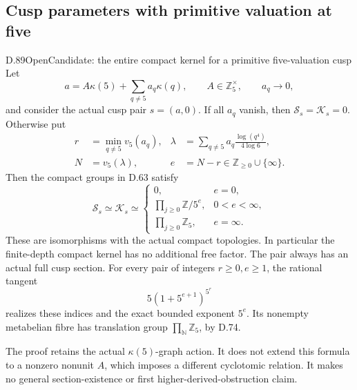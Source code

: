 \subsection{Cusp parameters with primitive valuation at five}

\begin{statement}{D.89}{Open}{Candidate: the entire compact kernel for a primitive five-valuation cusp}
Let
\[
 a=A\kappa(5)+\sum_{q\ne5}a_q\kappa(q),\qquad
 A\in\mathbb Z_5^\times,\qquad a_q\longrightarrow0,
\]
and consider the actual cusp pair \(s=(a,0)\).
If all \(a_q\) vanish, then \(\mathcal S_s=\mathcal K_s=0\).
Otherwise put
\[
 \begin{aligned}
 r&=\min_{q\ne5}v_5(a_q),&
 \lambda&=\sum_{q\ne5}a_q\frac{\log(q^4)}{4\log6},\\
 N&=v_5(\lambda),&e&=N-r\in\mathbb Z_{\ge0}\cup\{\infty\}.
 \end{aligned}                                             \tag{D.89.1}
\]
Then the compact groups in D.63 satisfy
\[
 \mathcal S_s\simeq\mathcal K_s\simeq
 \begin{cases}
  0,&e=0,\\
  \displaystyle\prod_{j\ge0}\mathbb Z/5^e,&0<e<\infty,\\
  \displaystyle\prod_{j\ge0}\mathbb Z_5,&e=\infty.
 \end{cases}                                               \tag{D.89.2}
\]
These are isomorphisms with the actual compact topologies.
In particular the finite-depth compact kernel has no additional
free factor. The pair always has an actual full cusp section.
For every pair of integers \(r\ge0,e\ge1\), the rational
tangent
\[
                  5(1+5^{e+1})^{5^r}                     \tag{D.89.3}
\]
realizes these indices and the exact bounded exponent \(5^e\).
Its nonempty metabelian fibre has translation group
\(\prod_{\mathbb N}\mathbb Z_5\), by D.74.

The proof retains the actual \(\kappa(5)\)-graph action.
It does not extend this formula to a nonzero nonunit \(A\),
which imposes a different cyclotomic relation. It makes no
general section-existence or first higher-derived-obstruction claim.
\end{statement}

